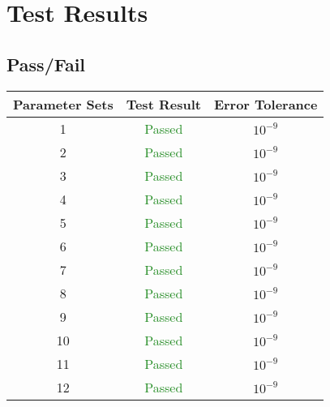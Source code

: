 \section{Test Results}

\subsection{Pass/Fail}

\begin{center}
\begin{tabular}{|c|c|c|}
\hline
Parameter Sets & Test Result & Error Tolerance \\ \hline \hline
1  & \textcolor{ForestGreen}{Passed} & $10^{-9}$ \\ \hline
2  & \textcolor{ForestGreen}{Passed} & $10^{-9}$ \\ \hline
3  & \textcolor{ForestGreen}{Passed} & $10^{-9}$ \\ \hline
4  & \textcolor{ForestGreen}{Passed} & $10^{-9}$ \\ \hline
5  &\textcolor{ForestGreen}{Passed}& $10^{-9}$ \\ \hline
6  & \textcolor{ForestGreen}{Passed} & $10^{-9}$ \\ \hline
7  & \textcolor{ForestGreen}{Passed} & $10^{-9}$ \\ \hline
8  & \textcolor{ForestGreen}{Passed} & $10^{-9}$ \\ \hline
9  & \textcolor{ForestGreen}{Passed} & $10^{-9}$ \\ \hline
10  &\textcolor{ForestGreen}{Passed}& $10^{-9}$ \\ \hline
11  & \textcolor{ForestGreen}{Passed} & $10^{-9}$ \\ \hline
12  &\textcolor{ForestGreen}{Passed} & $10^{-9}$ \\ 
\hline

\end{tabular}
\end{center}


